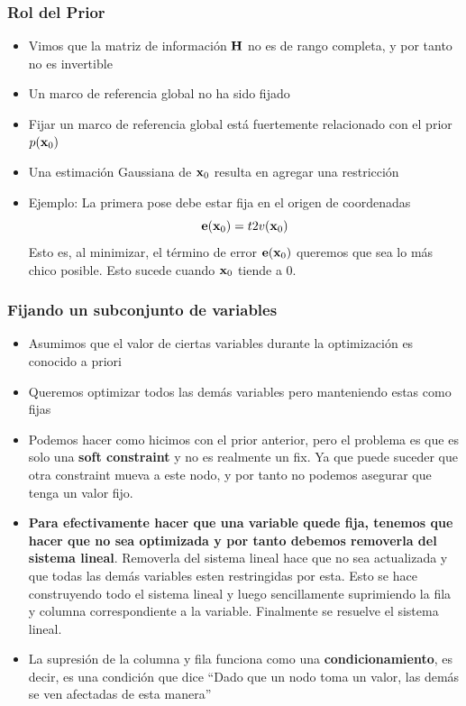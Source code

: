 \begin{frame}
    \frametitle{Rol del Prior}
    
    \begin{itemize}
        \item Vimos que la matriz de información $\boldsymbol{\mathbf{H}}$ no es de rango completa, y por tanto no es invertible
        \item Un marco de referencia global no ha sido fijado
        \item Fijar un marco de referencia global está fuertemente relacionado con el prior $p(\boldsymbol{\mathbf{x}}_{0})$
        \item Una estimación Gaussiana de $\boldsymbol{\mathbf{x}}_{0}$ resulta en agregar una restricción
        \item Ejemplo: La primera pose debe estar fija en el origen de coordenadas
        \begin{equation*}
            \boldsymbol{\mathbf{e}}(\boldsymbol{\mathbf{x}}_{0}) = t2v(\boldsymbol{\mathbf{x}}_{0})
        \end{equation*}
        Esto es, al minimizar, el término de error $\boldsymbol{\mathbf{e}}(\boldsymbol{\mathbf{x}}_{0})$ queremos que sea lo más chico posible. Esto sucede cuando $\boldsymbol{\mathbf{x}}_{0}$ tiende a 0.
    \end{itemize}
    
\end{frame}

\begin{frame}
    \frametitle{Fijando un subconjunto de variables}
    
    \begin{itemize}
        \item Asumimos que el valor de ciertas variables durante la optimización es conocido a priori
        \item Queremos optimizar todos las demás variables pero manteniendo estas como fijas
        \item Podemos hacer como hicimos con el prior anterior, pero el problema es que es solo una {\bf soft constraint} y no es realmente un fix. Ya que puede suceder que otra constraint mueva a este nodo, y por tanto no podemos asegurar que tenga un valor fijo.
        \item \textbf{Para efectivamente hacer que una variable quede fija, tenemos que hacer que no sea optimizada y por tanto debemos removerla del sistema lineal}. Removerla del sistema lineal hace que no sea actualizada y que todas las demás variables esten restringidas por esta. Esto se hace construyendo todo el sistema lineal y luego sencillamente suprimiendo la fila y columna correspondiente a la variable. Finalmente se resuelve el sistema lineal.
        \item La supresión de la columna y fila funciona como una {\bf condicionamiento}, es decir, es una condición que dice ``Dado que un nodo toma un valor, las demás se ven afectadas de esta manera''
    \end{itemize}
    
\end{frame}

